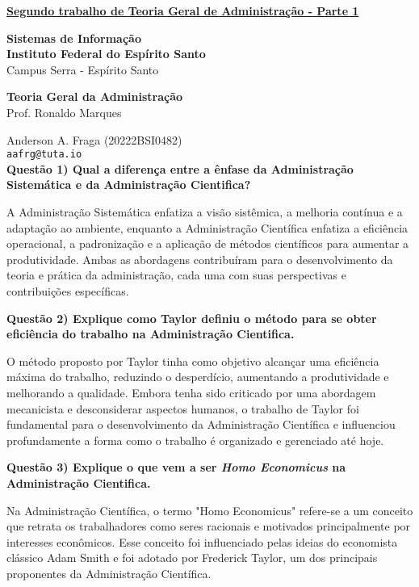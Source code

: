 \documentclass[11pt]{article}
\begin{document}
\underline{\textbf{Segundo trabalho de Teoria Geral de Administração - Parte 1}}\par
\textbf{Sistemas de Informação}\\
\textbf{Instituto Federal do Espírito Santo}\\
Campus Serra - Espírito Santo\par
\textbf{Teoria Geral da Administração}\\
Prof. Ronaldo Marques\par
Anderson A. Fraga (20222BSI0482)\\
\texttt{aafrg@tuta.io}\\  %


\noindent \textbf{Questão 1) Qual a diferença entre a ênfase da Administração Sistemática e da Administração Cientifica?}\par
A Administração Sistemática enfatiza a visão sistêmica, a melhoria contínua e a adaptação ao ambiente, enquanto a Administração Científica enfatiza a eficiência operacional, a padronização e a aplicação de métodos científicos para aumentar a produtividade. Ambas as abordagens contribuíram para o desenvolvimento da teoria e prática da administração, cada uma com suas perspectivas e contribuições específicas.\par

\noindent \textbf{Questão 2) Explique como Taylor definiu o método para se obter eficiência do trabalho na Administração Cientifica.}\par
O método proposto por Taylor tinha como objetivo alcançar uma eficiência máxima do trabalho, reduzindo o desperdício, aumentando a produtividade e melhorando a qualidade. Embora tenha sido criticado por uma abordagem mecanicista e desconsiderar aspectos humanos, o trabalho de Taylor foi fundamental para o desenvolvimento da Administração Científica e influenciou profundamente a forma como o trabalho é organizado e gerenciado até hoje.\par

\noindent \textbf{Questão 3) Explique o que vem a ser \emph{Homo Economicus} na Administração Cientifica.}\par
Na Administração Científica, o termo "Homo Economicus" refere-se a um conceito que retrata os trabalhadores como seres racionais e motivados principalmente por interesses econômicos. Esse conceito foi influenciado pelas ideias do economista clássico Adam Smith e foi adotado por Frederick Taylor, um dos principais proponentes da Administração Científica.
\end{document}
